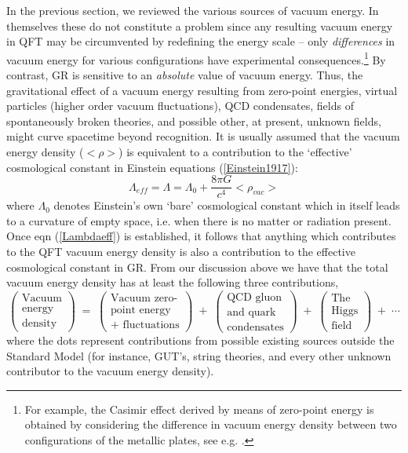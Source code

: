 \documentclass[12pt]{article}
\begin{document}
In the previous section, we reviewed the various sources of vacuum
energy. In themselves these do not constitute a problem since any
resulting vacuum energy in QFT may be circumvented by redefining the
energy scale -- only {\em differences} in vacuum energy for various
configurations have experimental consequences.\footnote{For example,
the Casimir effect derived by means of zero-point energy is obtained
by considering the difference in vacuum energy density between two
configurations of the metallic plates, see e.g.
\cite{rugh98}.} By contrast, GR is sensitive
to an {\em absolute} value of vacuum energy. Thus, the
gravitational effect of a vacuum energy resulting from zero-point
energies, virtual particles (higher order vacuum fluctuations),
QCD condensates, fields of spontaneously broken theories, and
possible other, at present, unknown fields, might curve spacetime
beyond recognition. It is usually assumed that the vacuum energy
density ($<\rho>$) is equivalent to a contribution to the `effective'
cosmological constant in Einstein equations (\ref{Einstein1917}): 
\begin{equation} \label{Lambdaeff}
\Lambda_{eff} = \Lambda = \Lambda_{0} + \frac{8 \pi G}{c^4} < \rho_{vac} >
\end{equation}
where $\Lambda_0$ denotes Einstein's own `bare' cosmological constant
which in itself leads to a curvature of empty space, i.e. when there is no
matter or radiation present.
Once eqn (\ref{Lambdaeff}) is  established, it follows that
anything which contributes to the QFT vacuum energy density is also a
contribution to the effective cosmological constant in GR. From
our discussion above we have that the total vacuum energy density has
at least the following three contributions,
\begin{equation} \label{Energyeff}
\left(
\begin{array}{c}
\mbox{Vacuum} \\
\mbox{energy}\\
\mbox{density} 
\end{array}
\right) \; = \;
\left(
\begin{array}{c}
\mbox{Vacuum zero-} \\
\mbox{point energy}\\
\mbox{+ fluctuations} 
\end{array}
\right) \; + \;
\left(
\begin{array}{c}
\mbox{QCD gluon} \\
\mbox{and quark} \\
\mbox{condensates}
\end{array}
\right) \; + \;
\left(
\begin{array}{c}
\mbox{The} \\
\mbox{Higgs} \\
\mbox{field}
\end{array}
\right)
\; + \; \cdots
\end{equation}
\noindent
where the dots represent contributions from possible existing
sources outside the Standard Model (for instance, GUT's, string 
theories, and every other unknown contributor to
the vacuum energy density). 
\end{document}
